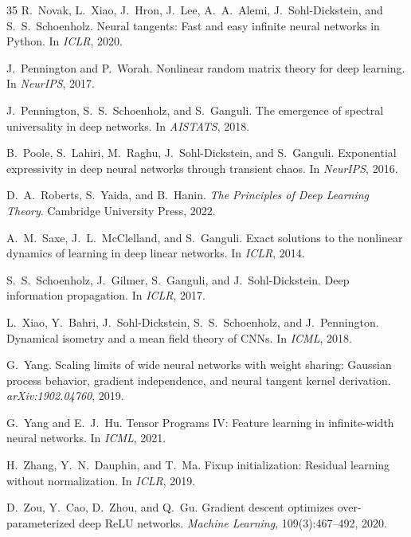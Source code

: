 \documentclass[10pt]{article}
\theoremstyle{definition}
\begin{document}
\begin{thebibliography}{35}
R.~Novak, L.~Xiao, J.~Hron, J.~Lee, A.~A.~Alemi, J.~Sohl-Dickstein, and S.~S.~Schoenholz.
\newblock Neural tangents: Fast and easy infinite neural networks in Python.
\newblock In \emph{ICLR}, 2020.

J.~Pennington and P.~Worah.
\newblock Nonlinear random matrix theory for deep learning.
\newblock In \emph{NeurIPS}, 2017.

J.~Pennington, S.~S.~Schoenholz, and S.~Ganguli.
\newblock The emergence of spectral universality in deep networks.
\newblock In \emph{AISTATS}, 2018.

B.~Poole, S.~Lahiri, M.~Raghu, J.~Sohl-Dickstein, and S.~Ganguli.
\newblock Exponential expressivity in deep neural networks through transient chaos.
\newblock In \emph{NeurIPS}, 2016.

D.~A.~Roberts, S.~Yaida, and B.~Hanin.
\newblock \emph{The Principles of Deep Learning Theory}.
\newblock Cambridge University Press, 2022.

A.~M.~Saxe, J.~L.~McClelland, and S.~Ganguli.
\newblock Exact solutions to the nonlinear dynamics of learning in deep linear networks.
\newblock In \emph{ICLR}, 2014.

S.~S.~Schoenholz, J.~Gilmer, S.~Ganguli, and J.~Sohl-Dickstein.
\newblock Deep information propagation.
\newblock In \emph{ICLR}, 2017.

L.~Xiao, Y.~Bahri, J.~Sohl-Dickstein, S.~S.~Schoenholz, and J.~Pennington.
\newblock Dynamical isometry and a mean field theory of CNNs.
\newblock In \emph{ICML}, 2018.

G.~Yang.
\newblock Scaling limits of wide neural networks with weight sharing: Gaussian process behavior, gradient independence, and neural tangent kernel derivation.
\newblock \emph{arXiv:1902.04760}, 2019.

G.~Yang and E.~J.~Hu.
\newblock Tensor Programs IV: Feature learning in infinite-width neural networks.
\newblock In \emph{ICML}, 2021.

H.~Zhang, Y.~N.~Dauphin, and T.~Ma.
\newblock Fixup initialization: Residual learning without normalization.
\newblock In \emph{ICLR}, 2019.

D.~Zou, Y.~Cao, D.~Zhou, and Q.~Gu.
\newblock Gradient descent optimizes over-parameterized deep ReLU networks.
\newblock \emph{Machine Learning}, 109(3):467--492, 2020.

\end{thebibliography}
\endgroup
\end{document}
